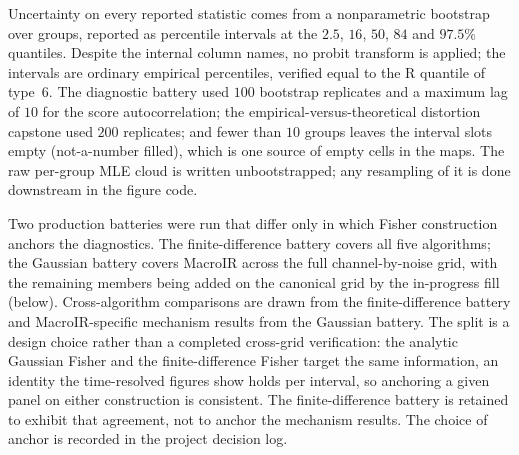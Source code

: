 Uncertainty on every reported statistic comes from a nonparametric bootstrap over
groups, reported as percentile intervals at the $2.5$, $16$, $50$, $84$ and
$97.5\%$ quantiles. Despite the internal column names, no probit transform is
applied; the intervals are ordinary empirical percentiles, verified equal to the
R quantile of type~$6$.
The diagnostic battery used $100$ bootstrap replicates and a maximum lag of $10$ for
the score autocorrelation; the empirical-versus-theoretical distortion capstone used
$200$ replicates; and fewer than $10$ groups leaves the interval slots empty
(not-a-number filled), which is one source of empty cells in the maps.
The raw per-group MLE cloud is written unbootstrapped; any resampling of it is done
downstream in the figure code.

Two production batteries were run that differ only in which Fisher construction
anchors the diagnostics. The finite-difference battery covers all five algorithms;
the Gaussian battery covers MacroIR across the full channel-by-noise grid, with the
remaining members being added on the canonical grid by the in-progress fill (below).
Cross-algorithm comparisons are drawn from the finite-difference battery and
MacroIR-specific mechanism results from the Gaussian battery. The split is a design
choice rather than a completed cross-grid verification: the analytic Gaussian Fisher
and the finite-difference Fisher target the same information, an identity the
time-resolved figures show holds per interval, so anchoring a given panel on either
construction is consistent. The finite-difference battery is retained to exhibit that
agreement, not to anchor the mechanism results. The choice of anchor is recorded in
the project decision log.

